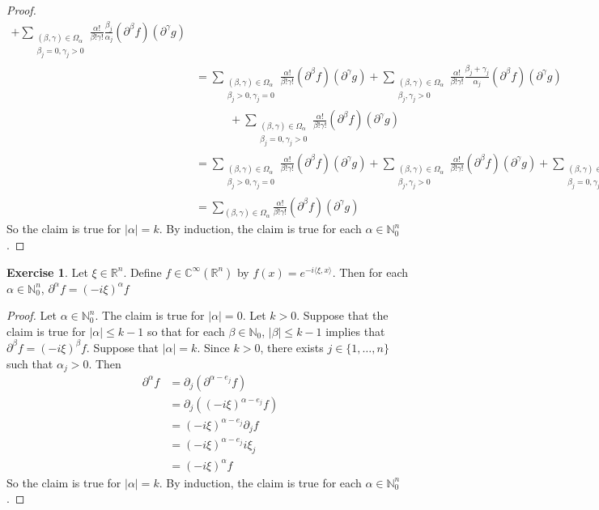 \documentclass{book}
\theoremstyle{definition}
\newtheorem{ex}[definition]{Exercise}
\newcommand{\al}{\alpha}
\newcommand{\be}{\beta}
\newcommand{\gam}{\gamma}
\newcommand{\Om}{\Omega}
\newcommand{\C}{\mathbb{C}}
\newcommand{\N}{\mathbb{N}}
\newcommand{\R}{\mathbb{R}}
\DeclareMathOperator*{\0}{\mbf{0}}
\DeclareMathOperator*{\1}{\mbf{1}}
\renewcommand{\r}{\rangle}
\renewcommand{\l}{\langle}
\newcommand{\p}{\partial}
\begin{document}
\begin{proof}
\begin{align*}
			+ \sum_{\substack{(\be, \gam) \in \Om_{\al} \\ \be_j = 0, \gam_j > 0}} \frac{\al!}{\be !\gam !} \frac{\be_j}{\al_j}(\p^{\be} f) (\p^{\gam}g)\\ 
			& = \sum_{\substack{(\be, \gam) \in \Om_{\al} \\ \be_j > 0, \gam_j = 0}} \frac{\al!}{\be !\gam !} (\p^{\be} f) (\p^{\gam}g) 
			+ \sum_{\substack{(\be, \gam) \in \Om_{\al} \\ \be_j, \gam_j > 0}} \frac{\al!}{\be !\gam !} \frac{\be_j + \gam_j}{\al_j}(\p^{\be} f) (\p^{\gam}g) \\
			& \quad \quad \quad + \sum_{\substack{(\be, \gam) \in \Om_{\al} \\ \be_j = 0, \gam_j > 0}} \frac{\al!}{\be !\gam !} (\p^{\be} f) (\p^{\gam}g)\\ 
			& = \sum_{\substack{(\be, \gam) \in \Om_{\al} \\ \be_j > 0, \gam_j = 0}} \frac{\al!}{\be !\gam !} (\p^{\be} f) (\p^{\gam}g) 
			+ \sum_{\substack{(\be, \gam) \in \Om_{\al} \\ \be_j, \gam_j > 0}} \frac{\al!}{\be !\gam !} (\p^{\be} f) (\p^{\gam}g) +  \sum_{\substack{(\be, \gam) \in \Om_{\al} \\ \be_j = 0, \gam_j > 0}} \frac{\al!}{\be !\gam !} (\p^{\be} f) (\p^{\gam}g)\\ 
			& = \sum_{(\be, \gam) \in \Om_{\al}} \frac{\al!}{\be !\gam !} (\p^{\be} f) (\p^{\gam}g) 
		\end{align*}
		So the claim is true for $|\al| = k$. By induction, the claim is true for each $\al \in \N_0^n$.
	\end{proof}

	\begin{ex}
		Let $\xi \in \R^n$. Define $f \in \C^{\infty}(\R^n)$ by $f(x) = e^{-i \l \xi , x \r}$. Then for each $\al \in \N_{0}^n$, $\p^{\al} f = (-i \xi)^{\al} f$
	\end{ex}

	\begin{proof}
		Let $\al \in \N_0^n$. The claim is true for $|\al| = 0$. Let $k > 0$. Suppose that the claim is true for $|\al| \leq k-1$ so that for each $\be \in \N_0$, $|\be| \leq k-1$ implies that $\p^{\be} f = (-i\xi)^{\be} f$. Suppose that $|\al| = k$. Since $k > 0$, there exists $j \in \{1, \ldots, n\}$ such that $\al_j >0$. Then
		\begin{align*}
			\p^{\al} f
			& = \p_j (\p^{\al - e_j} f) \\
			& = \p_j( (-i \xi)^{\al - e_j} f) \\
			& = (-i \xi)^{\al - e_j} \p_j f \\
			& = (-i \xi)^{\al - e_j} i \xi_j \\
			& = (-i \xi)^{\al} f
		\end{align*}  
		So the claim is true for $|\al| = k$. By induction, the claim is true for each $\al \in \N_0^n$.
		
	\end{proof}
	
\end{document}
